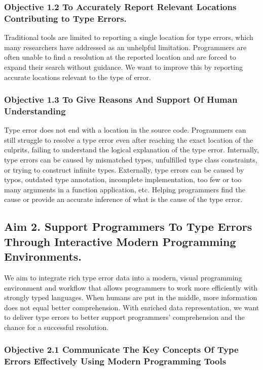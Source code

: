 \subsubsection{Objective 1.2 To Accurately Report Relevant Locations Contributing to Type Errors.}
Traditional tools are limited to reporting a single location for type errors, which many researchers have addressed as an unhelpful limitation. Programmers are often unable to find a resolution at the reported location and are forced to expand their search without guidance. We want to improve this by reporting accurate locations relevant to the type of error.

\subsubsection{Objective 1.3 To Give Reasons And Support Of Human Understanding}
Type error does not end with a location in the source code. Programmers can still struggle to resolve a type error even after reaching the exact location of the culprits, failing to understand the logical explanation of the type error. Internally, type errors can be caused by mismatched types, unfulfilled type class constraints, or trying to construct infinite types. Externally, type errors can be caused by typos, outdated type annotation, incomplete implementation, too few or too many arguments in a function application, etc. Helping programmers find the cause or provide an accurate inference of what is the cause of the type error.


\subsection{Aim 2. Support Programmers To Type Errors Through Interactive Modern Programming Environments.}

We aim to integrate rich type error data into a modern, visual programming environment and workflow that allows programmers to work more efficiently with strongly typed languages. When humans are put in the middle, more information does not equal better comprehension. With enriched data representation, we want to deliver type errors to better support programmers’ comprehension and the chance for a successful resolution.

\subsubsection{Objective 2.1 Communicate The Key Concepts Of Type Errors Effectively Using Modern Programming Tools}

